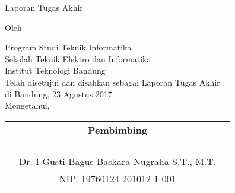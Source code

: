 \clearpage
\pagestyle{empty}

\begin{center}
    \smallskip

    \Large \bfseries \MakeUppercase{\thetitle}
    \vfill

    \Large Laporan Tugas Akhir
    \vfill

    \large Oleh

    \Large \theauthor

    \large Program Studi Teknik Informatika \\
    \normalsize \normalfont
    Sekolah Teknik Elektro dan Informatika \\
    Institut Teknologi Bandung \\

    \vfill
    \normalsize \normalfont
    Telah disetujui dan disahkan sebagai Laporan Tugas Akhir \\ di Bandung, 23 Agustus 2017 \\
    Mengetahui,

    \vfill
    \setlength{\tabcolsep}{12pt}
    \begin{tabularx}{\textwidth}{c@{\hskip 0.2\textwidth}cc@{\hskip 0.3\textwidth}}
         & {\bfseries Pembimbing}                                   & \\
         &                                                          & \\
         &                                                          & \\
         &                                                          & \\
         &                                                          & \\
         & \underline{Dr. I Gusti Bagus Baskara Nugraha S.T., M.T.} & \\
         & NIP. 19760124 201012 1 001                               &
    \end{tabularx}

\end{center}
\clearpage
